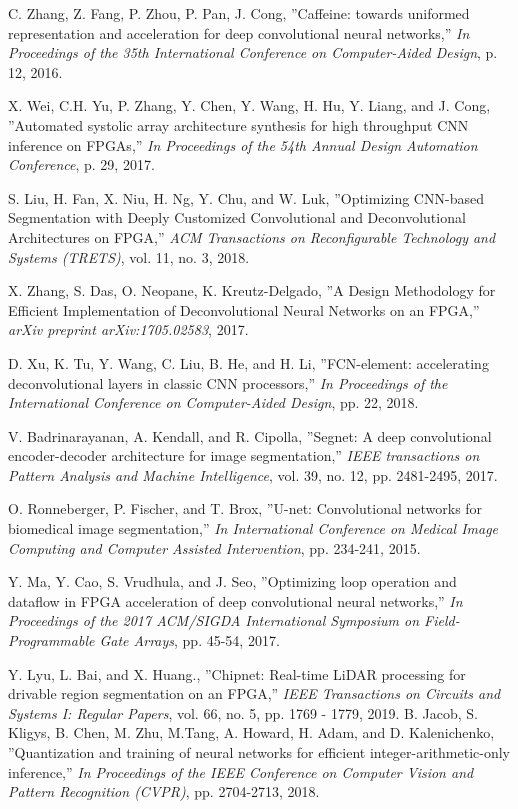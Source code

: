 \documentclass[conference]{IEEEtran}
\begin{document}
\begin{thebibliography}{9}
C. Zhang, Z. Fang, P. Zhou, P. Pan, J. Cong,
''Caffeine: towards uniformed representation and acceleration for deep convolutional neural networks,''
{\em In Proceedings of the 35th International Conference on Computer-Aided Design}, p. 12, 2016.

X. Wei, C.H. Yu, P. Zhang, Y. Chen, Y. Wang, H. Hu, Y. Liang, and J. Cong,
''Automated systolic array architecture synthesis for high throughput CNN inference on FPGAs,''
{\em In Proceedings of the 54th Annual Design Automation Conference}, p. 29, 2017.

S. Liu, H. Fan, X. Niu, H. Ng, Y. Chu, and W. Luk,
''Optimizing CNN-based Segmentation with Deeply Customized Convolutional and Deconvolutional Architectures on FPGA,''
{\em ACM Transactions on Reconfigurable Technology and Systems (TRETS)}, vol. 11, no. 3, 2018.

X. Zhang, S. Das, O. Neopane, K. Kreutz-Delgado,
''A Design Methodology for Efficient Implementation of Deconvolutional Neural Networks on an FPGA,''
{\em arXiv preprint arXiv:1705.02583}, 2017.

D. Xu, K. Tu, Y. Wang, C. Liu, B. He, and H. Li,
''FCN-element: accelerating deconvolutional layers in classic CNN processors,''
{\em In Proceedings of the International Conference on Computer-Aided Design}, pp. 22, 2018.

V. Badrinarayanan, A. Kendall, and R. Cipolla,
''Segnet: A deep convolutional encoder-decoder architecture for image segmentation,''
{\em IEEE transactions on Pattern Analysis and Machine Intelligence}, vol. 39, no. 12, pp. 2481-2495, 2017.

O. Ronneberger, P. Fischer, and T. Brox,
''U-net: Convolutional networks for biomedical image segmentation,''
{\em In International Conference on Medical Image Computing and Computer Assisted Intervention}, pp. 234-241, 2015.

Y. Ma, Y. Cao, S. Vrudhula, and J. Seo,
''Optimizing loop operation and dataflow in FPGA acceleration of deep convolutional neural networks,''
{\em In Proceedings of the 2017 ACM/SIGDA International Symposium on Field-Programmable Gate Arrays}, pp. 45-54, 2017.

Y. Lyu, L. Bai, and X. Huang.,
''Chipnet: Real-time LiDAR processing for drivable region segmentation on an FPGA,''
{\em IEEE Transactions on Circuits and Systems I: Regular Papers}, vol. 66, no. 5, pp. 1769 - 1779, 2019.
B. Jacob, S. Kligys, B. Chen, M. Zhu, M.Tang, A. Howard, H. Adam, and D. Kalenichenko,
''Quantization and training of neural networks for efficient integer-arithmetic-only inference,''
{\em In Proceedings of the IEEE Conference on Computer Vision and Pattern Recognition (CVPR)}, pp. 2704-2713, 2018.


\end{thebibliography}
\end{document}
